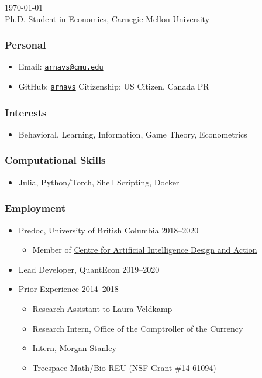 \documentclass[12pt]{article}   %
\begin{document}
\renewcommand{\labelitemi}{~}

 \hfill \monthyeardate\today \\
\flushleft Ph.D. Student in Economics, Carnegie Mellon University

\subsubsection*{Personal}
\begin{itemize}
  \item Email: \href{mailto:arnavs@cmu.edu}{\texttt{arnavs@cmu.edu}}
  \item GitHub: \href{https://github.com/arnavs}{\texttt{arnavs}} \hfill Citizenship: US Citizen, Canada PR
\end{itemize}

\subsubsection*{Interests}
\begin{itemize}
  \item Behavioral, Learning, Information, Game Theory, Econometrics
\end{itemize} 

\subsubsection*{Computational Skills}
\begin{itemize}
  \item Julia, Python/Torch, Shell Scripting, Docker
\end{itemize} 

\subsubsection*{Employment}
\begin{itemize}
  \item Predoc, University of British Columbia \hfill 2018--2020
  \begin{itemize} \small
    \item Member of \href{https://caida.ubc.ca/caida-ubc-icics-centre-artificial-intelligence-decision-making-and-action}{Centre for Artificial Intelligence Design and Action}
  \end{itemize}
  \item Lead Developer, QuantEcon \hfill 2019--2020
  \item Prior Experience \hfill 2014--2018 
  \begin{itemize}\setlength{\leftskip}{1cm}
    \item Research Assistant to Laura Veldkamp
    \item Research Intern, Office of the Comptroller of the Currency
    \item Intern, Morgan Stanley 
    \item Treespace Math/Bio REU (NSF Grant \#14-61094)
  \end{itemize}
\end{itemize}
\end{document}
